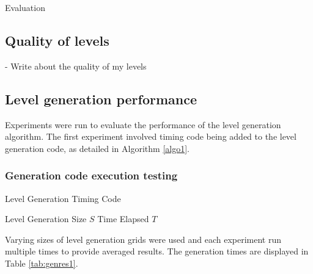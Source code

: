 \documentclass[final]{cmpreport}
\begin{document}
\begin{section}{Evaluation}

\subsection{Quality of levels}
- Write about the quality of my levels

\subsection{Level generation performance}
Experiments were run to evaluate the performance of the level generation algorithm. The first experiment involved timing code being added to the level generation code, as detailed in Algorithm \ref{algo1}.

\subsubsection{Generation code execution testing}

\begin{algorithm}[H]
    \caption{Level Generation Timing Code}
    \label{algo1}
    \begin{algorithmic}[1]
        \Require Level Generation Size ${S}$
        \Ensure Time Elapsed $T$
         
         
         
         
         
             
                 
                 
                 
            \EndIf{}
        \EndFor{}
        \EndFor{}


\end{algorithmic}
\end{algorithm}

Varying sizes of level generation grids were used and each experiment run multiple times to provide averaged results. The generation times are displayed in Table \ref{tab:genres1}.


\end{section}
\end{document}
